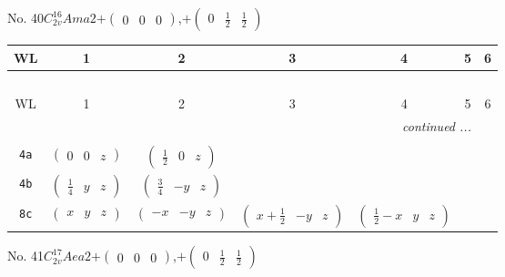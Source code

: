 \documentclass[fleqn,9pt,landscape]{jsarticle}
\begin{document}
\newpage
No. 40\quad$C_{2v}^{16}$\quad$Ama2$\quad[ orthorhombic ]\quad$+\begin{pmatrix} 0 & 0 & 0 \end{pmatrix}$,\quad $+\begin{pmatrix} 0 & \frac{1}{2} & \frac{1}{2} \end{pmatrix}$
\begin{center}
\renewcommand{\arraystretch}{1.2}
\begin{longtable}{ccccccc}
 \hline \hline
WL & 1 & 2 & 3 & 4 & 5 & 6 \\ \hline \endfirsthead

\multicolumn{6}{l}{\tablename\ \thetable{}} \\
 \hline \hline
WL & 1 & 2 & 3 & 4 & 5 & 6 \\ \hline \endhead

 \hline \hline
\multicolumn{6}{r}{\footnotesize\it continued ...} \\ \endfoot

 \hline \hline
\multicolumn{6}{r}{} \\ \endlastfoot

{\tt 4a} & $ \begin{pmatrix} 0 & 0 & z \end{pmatrix} $ & $ \begin{pmatrix} \frac{1}{2} & 0 & z \end{pmatrix} $ & $  $ & $  $ \\ \hline
{\tt 4b} & $ \begin{pmatrix} \frac{1}{4} & y & z \end{pmatrix} $ & $ \begin{pmatrix} \frac{3}{4} & - y & z \end{pmatrix} $ & $  $ & $  $ \\ \hline
{\tt 8c} & $ \begin{pmatrix} x & y & z \end{pmatrix} $ & $ \begin{pmatrix} - x & - y & z \end{pmatrix} $ & $ \begin{pmatrix} x + \frac{1}{2} & - y & z \end{pmatrix} $ & $ \begin{pmatrix} \frac{1}{2} - x & y & z \end{pmatrix} $ \\
\end{longtable}
\end{center}
\newpage
No. 41\quad$C_{2v}^{17}$\quad$Aea2$\quad[ orthorhombic ]\quad$+\begin{pmatrix} 0 & 0 & 0 \end{pmatrix}$,\quad $+\begin{pmatrix} 0 & \frac{1}{2} & \frac{1}{2} \end{pmatrix}$
\end{document}
